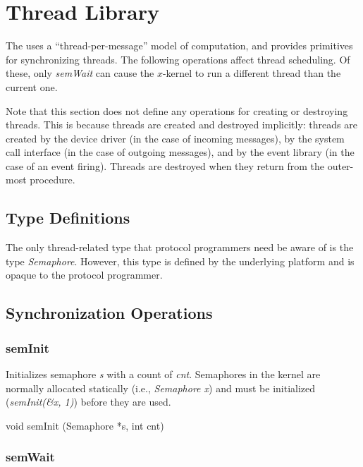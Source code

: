 % 
%
%

\section{Thread Library}
\label{thread}

The \xk{} uses a ``thread-per-message'' model of computation, and
provides primitives for synchronizing threads.  The following
operations affect
thread scheduling.  Of these, only {\em semWait}
can cause the $x$-kernel to run a different thread than the current one.

Note that this section does not define any operations for creating or
destroying threads. This is because \xk{} threads are created and
destroyed implicitly: threads are created by the device driver (in the
case of incoming messages), by the system call interface (in the case
of outgoing messages), and by the event library (in the case of an
event firing). Threads are destroyed when they return from the
outer-most procedure.

\subsection{Type Definitions}

The only thread-related type that protocol programmers need be
aware of is the type {\em Semaphore}. However, this type is defined
by the underlying platform and is opaque to the protocol programmer.

\subsection{Synchronization Operations}

\subsubsection{semInit}

Initializes semaphore {\em s} with a count of {\em cnt}.  Semaphores
in the kernel are normally allocated statically (i.e., {\em Semaphore
x}) and must be initialized ({\em semInit(\&x, 1)}) before they are
used.\medskip

{\sem void} {\bold semInit} ({\sem Semaphore}  *{\caps s}, {\sem int} {\caps cnt})\\

\subsubsection{semWait}


